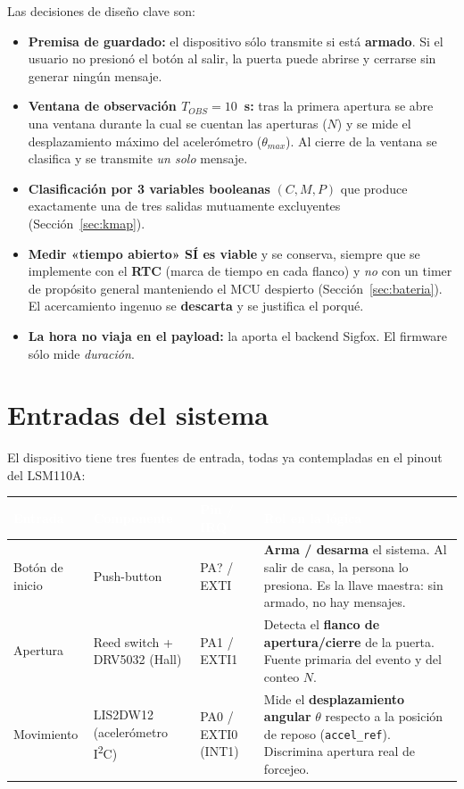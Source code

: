 \documentclass[11pt,a4paper]{article}
\newcommand{\dec}[1]{\textcolor{Green0G}{\textbf{#1}}}
\newcommand{\desc}[1]{\textcolor{Red0G}{\textbf{#1}}}
\begin{document}
Las decisiones de diseño clave son:

\begin{itemize}[leftmargin=1.4em,itemsep=0.3em]
  \item \dec{Premisa de guardado:} el dispositivo sólo transmite si está
  \textbf{armado}. Si el usuario no presionó el botón al salir, la puerta puede
  abrirse y cerrarse sin generar ningún mensaje.
  \item \dec{Ventana de observación $T_{OBS}=10$~s:} tras la primera apertura se
  abre una ventana durante la cual se cuentan las aperturas ($N$) y se mide el
  desplazamiento máximo del acelerómetro ($\theta_{max}$). Al cierre de la
  ventana se clasifica y se transmite \emph{un solo} mensaje.
  \item \dec{Clasificación por 3 variables booleanas} $(C, M, P)$ que produce
  exactamente una de tres salidas mutuamente excluyentes (Sección~\ref{sec:kmap}).
  \item \dec{Medir «tiempo abierto» SÍ es viable} y se conserva, siempre que se
  implemente con el \textbf{RTC} (marca de tiempo en cada flanco) y \emph{no} con
  un timer de propósito general manteniendo el MCU despierto
  (Sección~\ref{sec:bateria}). El acercamiento ingenuo se \desc{descarta} y se
  justifica el porqué.
  \item \dec{La hora no viaja en el payload:} la aporta el backend Sigfox. El
  firmware sólo mide \emph{duración}.
\end{itemize}

\section{Entradas del sistema}

El dispositivo tiene tres fuentes de entrada, todas ya contempladas en el pinout
del LSM110A:

\begin{center}
\renewcommand{\arraystretch}{1.35}
\begin{tabularx}{\linewidth}{@{}l l l X@{}}
\toprule
\rowcolor{Indigo0G}
\textcolor{white}{\textbf{Entrada}} & \textcolor{white}{\textbf{Componente}} &
\textcolor{white}{\textbf{Pin / IRQ}} & \textcolor{white}{\textbf{Rol en la lógica}} \\
\midrule
Botón de inicio & Push-button & PA? / EXTI &
\textbf{Arma / desarma} el sistema. Al salir de casa, la persona lo presiona.
Es la llave maestra: sin armado, no hay mensajes. \\
\rowcolor{Light0G}
Apertura & Reed switch + DRV5032 (Hall) & PA1 / EXTI1 &
Detecta el \textbf{flanco de apertura/cierre} de la puerta. Fuente primaria del
evento y del conteo $N$. \\
Movimiento & LIS2DW12 (acelerómetro I\textsuperscript{2}C) & PA0 / EXTI0 (INT1) &
Mide el \textbf{desplazamiento angular} $\theta$ respecto a la posición de reposo
(\texttt{accel\_ref}). Discrimina apertura real de forcejeo. \\
\bottomrule
\end{tabularx}
\end{center}
\end{document}
